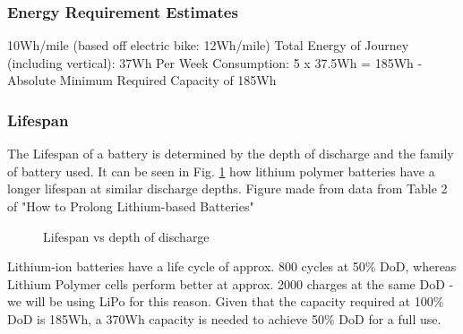 \documentclass[journal,10pt]{IEEEtran}
\begin{document}
        \subsubsection{Energy Requirement Estimates}
            10Wh/mile (based off electric bike: 12Wh/mile)
            Total Energy of Journey (including vertical): 37Wh
            Per Week Consumption: 5 x 37.5Wh = 185Wh
            -Absolute Minimum Required Capacity of 185Wh
        \subsubsection{Lifespan}
            The Lifespan of a battery is determined by the depth of discharge and the family of battery used. It can be seen in Fig. \ref{fig:DoD} how lithium polymer batteries have a longer lifespan at similar discharge depths. 
            Figure made from data from Table 2 of "How to Prolong Lithium-based Batteries" \cite{BatteryLifespan} 
            \begin{figure}[H]
                \centering
                \caption{Lifespan vs depth of discharge}
                \label{fig:DoD}
            \end{figure}
            Lithium-ion batteries have a life cycle of approx. 800 cycles at 50\% DoD, whereas Lithium Polymer cells perform better at approx. 2000 charges at the same DoD - we will be using LiPo for this reason. Given that the capacity required at 100\% DoD is 185Wh, a 370Wh capacity is needed to achieve 50\% DoD for a full use.
\end{document}
